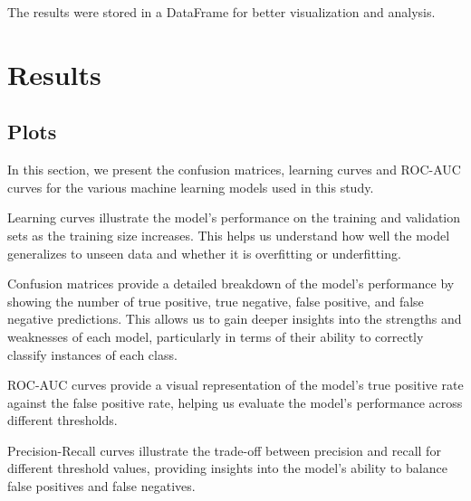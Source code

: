 \documentclass[12pt]{report}
\begin{document}
The results were stored in a DataFrame for better visualization and analysis.

\chapter{Results}
\section{Plots}

In this section, we present the confusion matrices, learning curves and ROC-AUC curves for the various machine learning models used in this study.

Learning curves illustrate the model's performance on the training and validation sets as the training size increases. This helps us understand how well the model generalizes to unseen data and whether it is overfitting or underfitting.

Confusion matrices provide a detailed breakdown of the model's performance by showing the number of true positive, true negative, false positive, and false negative predictions. This allows us to gain deeper insights into the strengths and weaknesses of each model, particularly in terms of their ability to correctly classify instances of each class.

ROC-AUC curves provide a visual representation of the model's true positive rate against the false positive rate, helping us evaluate the model's performance across different thresholds.

Precision-Recall curves illustrate the trade-off between precision and recall for different threshold values, providing insights into the model's ability to balance false positives and false negatives.
\end{document}
